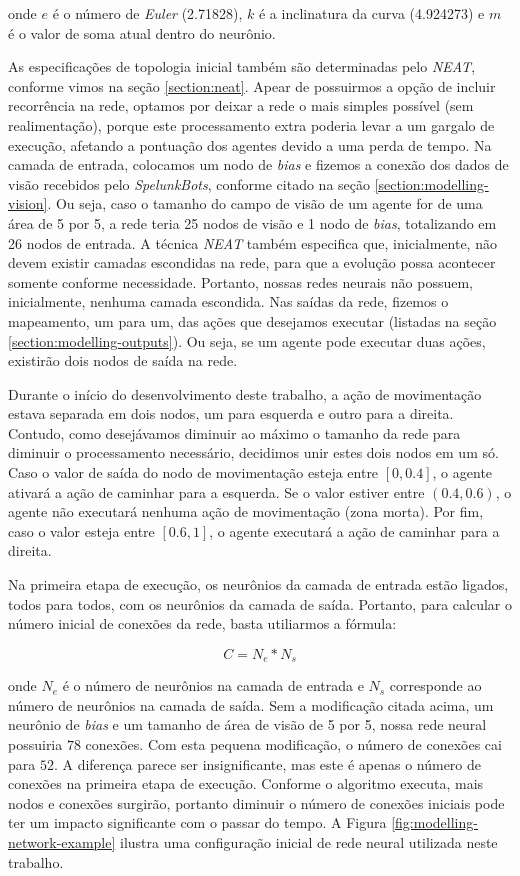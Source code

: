 onde $e$ é o número de \textit{Euler} (2.71828), $k$ é a inclinatura da curva
(4.924273) e $m$ é o valor de soma atual dentro do neurônio.

As especificações de topologia inicial também são determinadas pelo
\textit{NEAT}, conforme vimos na seção \ref{section:neat}. Apear de possuirmos a
opção de incluir recorrência na rede, optamos por deixar a rede o mais simples
possível (sem realimentação), porque este processamento extra poderia levar a um
gargalo de execução, afetando a pontuação dos agentes devido a uma perda de
tempo. Na camada de entrada, colocamos um nodo de \textit{bias} e  fizemos a
conexão dos dados de visão recebidos pelo \textit{SpelunkBots}, conforme citado
na seção \ref{section:modelling-vision}. Ou seja, caso o tamanho do campo de
visão de um agente for de uma área de 5 por 5, a rede teria 25 nodos de visão e
1 nodo de \textit{bias}, totalizando em 26 nodos de entrada. A técnica
\textit{NEAT} também especifica que, inicialmente, não devem existir camadas
escondidas na rede, para que a evolução possa acontecer somente conforme
necessidade. Portanto, nossas redes neurais não possuem, inicialmente, nenhuma
camada escondida. Nas saídas da rede, fizemos o mapeamento, um para um, das
ações que desejamos executar (listadas na seção \ref{section:modelling-outputs}).
Ou seja, se um agente pode executar duas ações, existirão dois nodos de saída na
rede.

Durante o início do desenvolvimento deste trabalho, a ação de movimentação
estava separada em dois nodos, um para esquerda e outro para a direita. Contudo,
como desejávamos diminuir ao máximo o tamanho da rede para diminuir o
processamento necessário, decidimos unir estes dois nodos em um só. Caso o valor
de saída do nodo de movimentação esteja entre $[0,0.4]$, o agente ativará a ação
de caminhar para a esquerda. Se o valor estiver entre $(0.4,0.6)$, o agente não
executará nenhuma ação de movimentação (zona morta). Por fim, caso o valor
esteja entre $[0.6,1]$, o agente executará a ação de caminhar para a direita.

Na primeira etapa de execução, os neurônios da camada de entrada estão ligados,
todos para todos, com os neurônios da camada de saída. Portanto, para calcular o
número inicial de conexões da rede, basta utiliarmos a fórmula:

\begin{equation}
	\label{eq:network-connections}
	C = N_e * N_s
\end{equation}

onde $N_e$ é o número de neurônios na camada de entrada e $N_s$ corresponde ao
número de neurônios na camada de saída. Sem a modificação citada acima, um
neurônio de \textit{bias} e um tamanho de área de visão de 5 por 5, nossa rede
neural possuiria $78$ conexões.  Com esta pequena modificação, o número de
conexões cai para $52$. A diferença parece ser insignificante, mas este é apenas
o número de conexões na primeira etapa de execução. Conforme o algoritmo
executa, mais nodos e conexões surgirão, portanto diminuir o número de conexões
iniciais pode ter um impacto significante com o passar do tempo. A Figura
\ref{fig:modelling-network-example} ilustra uma configuração inicial de rede
neural utilizada neste trabalho.

